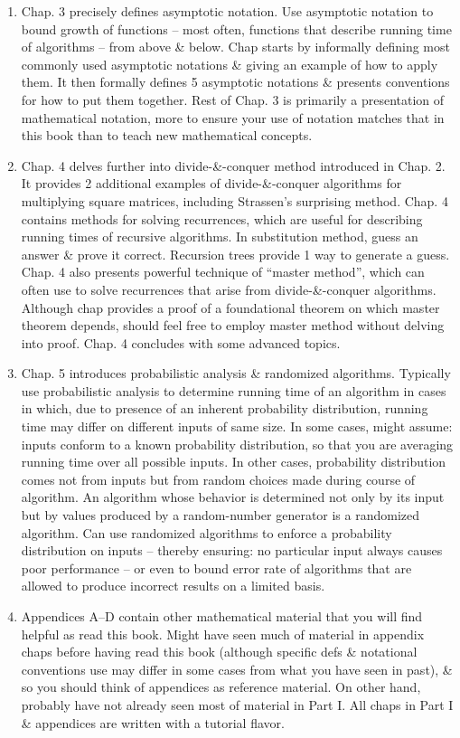 \documentclass{article}
\begin{document}
\begin{itemize}
\begin{itemize}
\begin{enumerate}
			\item Chap. 3 precisely defines asymptotic notation. Use asymptotic notation to bound growth of functions -- most often, functions that describe running time of algorithms -- from above \& below. Chap starts by informally defining most commonly used asymptotic notations \& giving an example of how to apply them. It then formally defines 5 asymptotic notations \& presents conventions for how to put them together. Rest of Chap. 3 is primarily a presentation of mathematical notation, more to ensure your use of notation matches that in this book than to teach new mathematical concepts.
			\item Chap. 4 delves further into divide-\&-conquer method introduced in Chap. 2. It provides 2 additional examples of divide-\&-conquer algorithms for multiplying square matrices, including Strassen's surprising method. Chap. 4 contains methods for solving recurrences, which are useful for describing running times of recursive algorithms. In substitution method, guess an answer \& prove it correct. Recursion trees provide 1 way to generate a guess. Chap. 4 also presents powerful technique of ``master method'', which can often use to solve recurrences that arise from divide-\&-conquer algorithms. Although chap provides a proof of a foundational theorem on which master theorem depends, should feel free to employ master method without delving into proof. Chap. 4 concludes with some advanced topics.
			\item Chap. 5 introduces probabilistic analysis \& randomized algorithms. Typically use probabilistic analysis to determine running time of an algorithm in cases in which, due to presence of an inherent probability distribution, running time may differ on different inputs of same size. In some cases, might assume: inputs conform to a known probability distribution, so that you are averaging running time over all possible inputs. In other cases, probability distribution comes not from inputs but from random choices made during course of algorithm. An algorithm whose behavior is determined not only by its input but by values produced by a random-number generator is a randomized algorithm. Can use randomized algorithms to enforce a probability distribution on inputs -- thereby ensuring: no particular input always causes poor performance -- or even to bound error rate of algorithms that are allowed to produce incorrect results on a limited basis.
			\item Appendices A--D contain other mathematical material that you will find helpful as read this book. Might have seen much of material in appendix chaps before having read this book (although specific defs \& notational conventions use may differ in some cases from what you have seen in past), \& so you should think of appendices as reference material. On other hand, probably have not already seen most of material in Part I. All chaps in Part I \& appendices are written with a tutorial flavor.

\end{enumerate}
\end{itemize}
\end{itemize}
\end{document}
